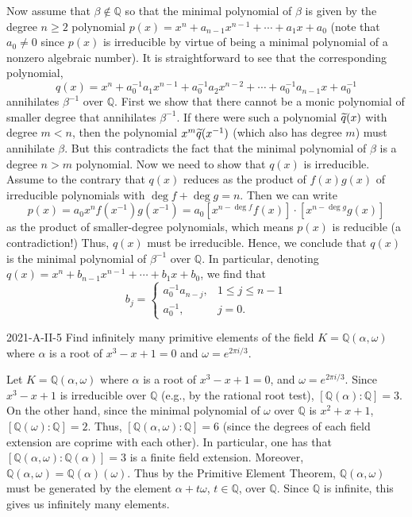 \documentclass{article}
\begin{document}
	Now assume that $\beta \notin \mathbb{Q}$ so that the minimal polynomial of $\beta$ is given by the degree $n \geq 2$ polynomial $p(x) = x^{n} + a_{n-1}x^{n - 1} + \dotsm + a_{1}x + a_{0}$ (note that $a_{0} \neq 0$ since $p(x)$ is irreducible by virtue of being a minimal polynomial of a nonzero algebraic number). It is straightforward to see that the corresponding polynomial, 
	\begin{equation*}
		q(x) = x^{n} + a_{0}^{-1}a_{1}x^{n-1} + a_{0}^{-1}a_{2}x^{n-2} + \dotsm + a_{0}^{-1}a_{n-1}x + a_{0}^{-1} 
	\end{equation*}
	annihilates $\beta^{-1}$ over $\mathbb{Q}$. First we show that there cannot be a monic polynomial of smaller degree that annihilates $\beta^{-1}$. If there were such a polynomial $\widetilde{q}(x)$ with degree $m < n$, then the polynomial $x^{m}\widetilde{q}(x^{-1})$ (which also has degree $m$) must annihilate $\beta$. But this contradicts the fact that the minimal polynomial of $\beta$ is a degree $n > m$ polynomial. Now we need to show that $q(x)$ is irreducible. Assume to the contrary that $q(x)$ reduces as the product of $f(x)g(x)$ of irreducible polynomials with $\deg{f} + \deg{g} = n$. Then we can write 
	\begin{equation*}
		p(x) = a_{0}x^{n}f(x^{-1})g(x^{-1}) = a_{0}[x^{n -\deg{f}}f(x)] \cdot [x^{n - \deg{g}}g(x)] 
	\end{equation*}
	as the product of smaller-degree polynomials, which means $p(x)$ is reducible (a contradiction!) Thus, $q(x)$ must be irreducible. Hence, we conclude that $q(x)$ is the minimal polynomial of $\beta^{-1}$ over $\mathbb{Q}$. In particular, denoting $q(x) = x^{n} + b_{n-1}x^{n-1} + \dotsm + b_{1}x + b_{0}$, we find that
	\begin{equation*}
		b_{j} = 
		\begin{cases}
			a_{0}^{-1}a_{n - j}, & 1 \leq j \leq n - 1 \\
			a_{0}^{-1}, & j= 0. 
		\end{cases}
	\end{equation*}
	
	\begin{prb}{2021-A-II-5}
		Find infinitely many primitive elements of the field $K = \mathbb{Q}(\alpha, \omega)$ where $\alpha$ is a root of $x^{3} - x + 1= 0$ and $\omega = e^{2\pi i /3}$. 
	\end{prb}
	Let $K = \mathbb{Q}(\alpha, \omega)$ where $\alpha$ is a root of $x^{3} - x + 1 = 0$, and $\omega = e^{2\pi i /3}$. Since $x^{3} - x + 1$ is irreducible over $\mathbb{Q}$ (e.g., by the rational root test), $[\mathbb{Q}(\alpha): \mathbb{Q}] = 3$. On the other hand, since the minimal polynomial of $\omega$ over $\mathbb{Q}$ is $x^{2} + x + 1$, $[\mathbb{Q}(\omega):\mathbb{Q}] = 2$. Thus, $[\mathbb{Q}(\alpha, \omega): \mathbb{Q}] = 6$ (since the degrees of each field extension are coprime with each other). In particular, one has that $[\mathbb{Q}(\alpha, \omega): \mathbb{Q}(\alpha)] = 3$ is a finite field extension. Moreover, $\mathbb{Q}(\alpha, \omega) = \mathbb{Q}(\alpha)(\omega)$. Thus by the Primitive Element Theorem, $\mathbb{Q}(\alpha,\omega)$ must be generated by the element $\alpha + t\omega$, $t \in \mathbb{Q}$, over $\mathbb{Q}$. Since $\mathbb{Q}$ is infinite, this gives us infinitely many elements. 
	
\end{document}
